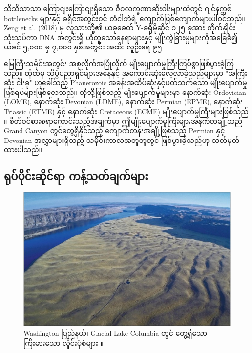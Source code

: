 \documentclass[10pt,twocolumn,letterpaper]{article}
\begin{document}
သိသိသာသာ ကြောငျးကြောငျးရှိသော ဇီဝလက္ခဏာဆိုးဝါးများထဲတွင် ဂျင်နက္တစ် bottlenecks များနှင့် ခရိုင်အတွင်းဝင် တံငါဘဲရဲ့ ကျောက်ဖြစ်ကျောက်များပါဝင်သည်။ Zeng et al. (2018) မှ လူသားတို့၏ ယခုခေတ် Y-ခရိုမိုဆိုင် ၁၂၅ ခုအား တိုက်နှိုင်းသုံးသပ်ကာ DNA အတွင်းရှိ ဟုံတူသောနေရာများနှင့် မျိုးကွဲခြားမှုများကိုအခြေခံ၍ ယခင် ၅,၀၀၀ မှ ၇,၀၀၀ နှစ်အတွင်း အထီး လူဦးရေ ၉၅%

မြေကြီးသမိုင်းအတွင်း အစုလိုက်အပြုံလိုက် မျိုးပျောက်မှုကြီးကြပ်စွာဖြစ်ပွားခဲ့ကြသည်။ ထိုထဲမှ သိပ္ပံပညာရှင်များအနေနှင့် အကောင်းဆုံးလေ့လာခဲ့သည်များမှာ "အကြီးဆုံး ငါးခု" ဟုခေါ်သည့် Phanerozoic အခန်းအထိပ်ဆုံးနှင့်ပတ်သက်သော မျိုးပျောက်မှုဖြစ်ရပ်များဖြစ်လေသည်။ ထိုသို့ဖြစ်သည့် မျိုးပျောက်မှုများမှာ နောက်ဆုံး Ordovician (LOME), နောက်ဆုံး Devonian (LDME), နောက်ဆုံး Permian (EPME), နောက်ဆုံး Triassic (ETME) နှင့် နောက်ဆုံး Cretaceous (ECME) မျိုးပျောက်မှုကြီးများဖြစ်သည် \cite{88,89}။ စိတ်ဝင်စားစရာကောင်းသည့်အချက်မှာ ဤမျိုးပျောက်မှုကြီးများအနက်တချို့သည် Grand Canyon တွင်တွေ့ရှိနိုင်သည့် ကျောက်တန်းအချို့ဖြစ်သည့် Permian နှင့် Devonian အလွှာများရှိသည့် သမိုင်းကာလအတူတူတွင် ဖြစ်ပွားခဲ့သည်ဟု သတ်မှတ်ထားပါသည်။

\subsection{ရုပ်ပိုင်းဆိုင်ရာ ကန့်သတ်ချက်များ}

\begin{figure}[b]
\begin{center}
   \includegraphics[width=1\linewidth]{columbia.jpg}
\end{center}
\caption{Washington ပြည်နယ်၊ Glacial Lake Columbia တွင် တွေ့ရှိသော ကြီးမားသော လှိုင်းပုံစံများ \cite{80} ။}
\label{fig:11}
\label{fig:onecol}
\end{figure}
\end{document}
